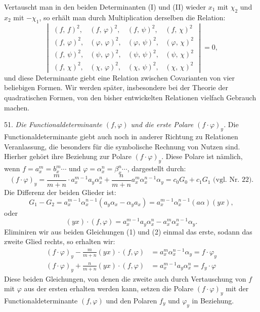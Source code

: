 \documentclass[11pt]{article}
\providecommand{\weberpage}[1]{}
\providecommand{\weq}[2]{\begin{equation}\tag{#1}#2\end{equation}}
\begin{document}
\weberpage{55}

Vertauscht man in den beiden Determinanten (I) und (II) wieder $x_1$ mit $\chi_2$ und $x_2$ mit $-\chi_1$, so erhält man durch Multiplication derselben die Relation:
\[
\begin{vmatrix}
(f,\,f)^2, & (f,\,\varphi)^2, & (f,\,\psi)^2, & (f,\,\chi)^2 \\
(f,\,\varphi)^2, & (\varphi,\,\varphi)^2, & (\varphi,\,\psi)^2, & (\varphi,\,\chi)^2 \\
(f,\,\psi)^2, & (\psi,\,\varphi)^2, & (\psi,\,\psi)^2, & (\psi,\,\chi)^2 \\
(f,\,\chi)^2, & (\chi,\,\varphi)^2, & (\chi,\,\psi)^2, & (\chi,\,\chi)^2
\end{vmatrix} = 0,
\]
und diese Determinante giebt eine Relation zwischen Covarianten von vier beliebigen Formen. Wir werden später, insbesondere bei der Theorie der quadratischen Formen, von den bisher entwickelten Relationen vielfach Gebrauch machen.

51. \textit{Die Functionaldeterminante $(f, \varphi)$ und die erste Polare $(f\cdot\varphi)_y$.} Die Functionaldeterminante giebt auch noch in anderer Richtung zu Relationen Veranlassung, die besonders für die symbolische Rechnung von Nutzen sind. Hierher gehört ihre Beziehung zur Polare $(f\cdot\varphi)_y$. Diese Polare ist nämlich, wenn $f = a_x^m = b_x^m\cdots$ und $\varphi = \alpha_x^n = \beta_x^n\cdots$, dargestellt durch:
\weq{1}{
(f\cdot\varphi)_y = \frac{m}{m+n}\cdot a_x^{m-1}a_y\alpha_x^n + \frac{n}{m+n}a_x^m\alpha_x^{n-1}\alpha_y = c_0G_0 + c_1G_1 \text{ (vgl. Nr. 22).}
}
Die Differenz der beiden Glieder ist:
\[
G_1 - G_2 = a_x^{m-1}\alpha_x^{n-1}(a_y\alpha_x - \alpha_ya_x) = a_x^{m-1}\alpha_x^{n-1}(a\alpha)(yx),
\]
oder
\weq{2}{
(yx)\cdot(f,\varphi) = a_x^{m-1}a_y\alpha_x^n - a_x^m\alpha_x^{n-1}\alpha_y.
}
Eliminiren wir aus beiden Gleichungen (1) und (2) einmal das erste, sodann das zweite Glied rechts, so erhalten wir:
\weq{I}{
\begin{aligned}
(f\cdot\varphi)_y - \frac{m}{m+n}(yx)\cdot(f,\varphi) &= a_x^m\alpha_x^{n-1}\alpha_y = f\cdot\varphi_y \\
(f\cdot\varphi)_y + \frac{n}{m+n}(yx)\cdot(f,\varphi) &= a_x^{m-1}a_y\alpha_x^n = f_y\cdot\varphi
\end{aligned}
}
Diese beiden Gleichungen, von denen die zweite auch durch Vertauschung von $f$ mit $\varphi$ aus der ersten erhalten werden kann, setzen die Polare $(f\cdot\varphi)_y$ mit der Functionaldeterminante $(f,\varphi)$ und den Polaren $f_y$ und $\varphi_y$ in Beziehung.
\end{document}
